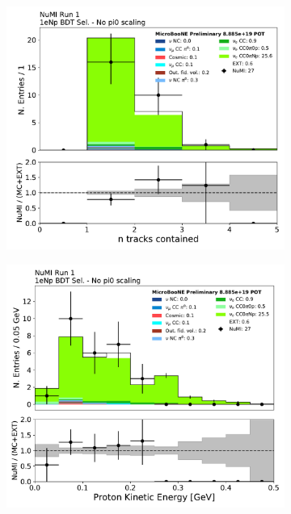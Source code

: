 \begin{figure}[H]
    \centering
    \begin{subfigure}{0.3\textwidth}
    \includegraphics[width=1.0\textwidth]{Sidebands/Figures/NuMI/1eNp/BDTSel/n_tracks_contained.pdf}
    \caption{}
    \end{subfigure}
    \begin{subfigure}{0.3\textwidth}
    \includegraphics[width=1.0\textwidth]{Sidebands/Figures/NuMI/1eNp/BDTSel/protonenergy.pdf}

\end{subfigure}
\end{figure}
